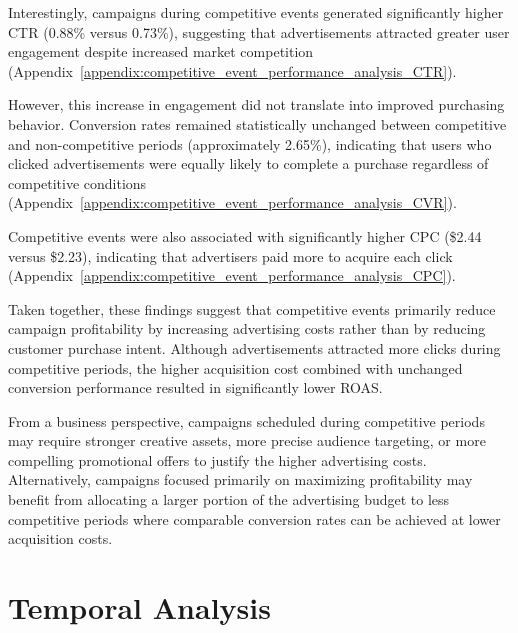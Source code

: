 Interestingly, campaigns during competitive events generated significantly higher CTR (0.88\% versus 0.73\%), suggesting that advertisements attracted greater user engagement despite increased market competition (Appendix~\ref{appendix:competitive_event_performance_analysis_CTR}).

However, this increase in engagement did not translate into improved purchasing behavior. Conversion rates remained statistically unchanged between competitive and non-competitive periods (approximately 2.65\%), indicating that users who clicked advertisements were equally likely to complete a purchase regardless of competitive conditions (Appendix~\ref{appendix:competitive_event_performance_analysis_CVR}).

Competitive events were also associated with significantly higher CPC (\$2.44 versus \$2.23), indicating that advertisers paid more to acquire each click (Appendix~\ref{appendix:competitive_event_performance_analysis_CPC}).

Taken together, these findings suggest that competitive events primarily reduce campaign profitability by increasing advertising costs rather than by reducing customer purchase intent. Although advertisements attracted more clicks during competitive periods, the higher acquisition cost combined with unchanged conversion performance resulted in significantly lower ROAS.

From a business perspective, campaigns scheduled during competitive periods may require stronger creative assets, more precise audience targeting, or more compelling promotional offers to justify the higher advertising costs. Alternatively, campaigns focused primarily on maximizing profitability may benefit from allocating a larger portion of the advertising budget to less competitive periods where comparable conversion rates can be achieved at lower acquisition costs.


\section{Temporal Analysis}


